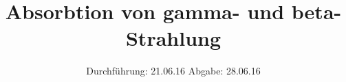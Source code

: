

\subject{Versuch 704}
\title{Absorbtion von gamma- und beta-Strahlung}
\date{
  Durchführung: 21.06.16
  \hspace{3em}
  Abgabe: 28.06.16
}



\maketitle
\thispagestyle{empty}
\tableofcontents
\newpage






\printbibliography


